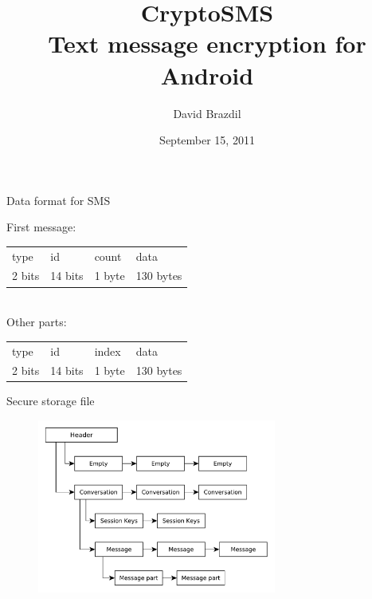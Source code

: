 \documentclass{beamer}
\title[CryptoSMS]{CryptoSMS\\Text message encryption for Android}
\author{David Brazdil}
\institute{University of Cambridge}
\date{September 15, 2011}
\begin{document}
\begin{frame}
\titlepage
\end{frame}



\begin{frame}{Data format for SMS}
%

First message: \\
\begin{tabularx}{\textwidth}{ |l|l|l|L| }
  \hline
  type    & id      & count   & data \\
  2 bits  & 14 bits & 1 byte  & 130 bytes  \\
  \hline
\end{tabularx} \newline
\\
Other parts: \\
\begin{tabularx}{\textwidth}{ |l|l|l|L| }
  \hline
  type    & id      & index   & data \\
  2 bits  & 14 bits & 1 byte  & 130 bytes  \\
  \hline
\end{tabularx}

\end{frame}



\begin{frame}{Secure storage file}
\begin{figure}
\centering
\includegraphics[width=0.7\textwidth]{storage_file}
\end{figure}
\end{frame}
\end{document}
